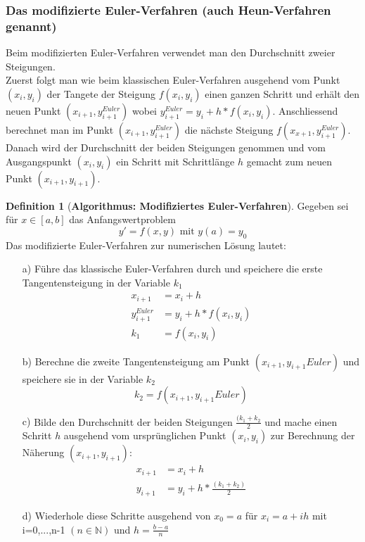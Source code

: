 \documentclass{article}
\theoremstyle{satz}
\theoremstyle{definition}
\newtheorem{definition}{Definition}
\begin{document}
\subsubsection{Das modifizierte Euler-Verfahren (auch Heun-Verfahren genannt)}
Beim modifizierten Euler-Verfahren verwendet man den Durchschnitt zweier Steigungen.\\
Zuerst folgt man wie beim klassischen Euler-Verfahren ausgehend vom Punkt $(x_i, y_i)$ der Tangete der Steigung $f(x_i, y_i)$ einen ganzen Schritt und erhält den neuen Punkt $(x_{i+1}, y^{Euler}_{i+1})$ wobei $y^{Euler}_{i+1} = y_i+h*f(x_i,y_i)$. Anschliessend berechnet man im Punkt $(x_{i+1},y^{Euler}_{i+1})$ die nächste Steigung $f(x_{x+1}, y^{Euler}_{i+1})$. Danach wird der Durchschnitt der beiden Steigungen genommen und vom Ausgangspunkt $(x_i, y_i)$ ein Schritt mit Schrittlänge $h$ gemacht zum neuen Punkt $(x_{i+1}, y_{i+1})$.

\begin{tcolorbox}
\begin{definition}[\textbf{Algorithmus: Modifiziertes Euler-Verfahren}]
Gegeben sei für $x \in [a,b]$ das Anfangswertproblem
\begin{equation}
y' = f(x,y) \textrm{ mit } y(a) = y_0
\end{equation}
Das modifizierte Euler-Verfahren zur numerischen Lösung lautet:
\begin{itemize}
\item[a)]{Führe das klassische Euler-Verfahren durch und speichere die erste Tangentensteigung in der Variable $k_1$
\begin{equation}
\begin{split}
x_{i+1} &= x_i + h\\
y_{i+1}^{Euler} &= y_i + h*f(x_i, y_i)\\
k_1 &= f(x_i, y_i)
\end{split}
\end{equation}
}
\item[b)]{Berechne die zweite Tangentensteigung am Punkt $(x_{i+1}, y_{i+1}{Euler})$ und speichere sie in der Variable $k_2$
\begin{equation}
k_2 = f(x_{i+1}, y_{i+1}{Euler})
\end{equation}
}
\item[c)]{Bilde den Durchschnitt der beiden Steigungen $\frac{(k_1 + k_2}{2}$ und mache einen Schritt $h$ ausgehend vom ursprünglichen Punkt $(x_i, y_i)$ zur Berechnung der Näherung $(x_{i+1}, y_{i+1})$:
\begin{equation}
\begin{split}
x_{i+1} &= x_i + h\\
y_{i+1} &= y_i + h * \frac{(k_1 + k_2)}{2}
\end{split}
\end{equation}
}
\item[d)]{Wiederhole diese Schritte ausgehend von $x_0 = a$ für $x_i = a + ih$ mit i=0,...,n-1 $(n \in \mathbb{N})$ und $h = \frac{b-a}{n}$
}

\end{itemize}

\end{definition}
\end{tcolorbox}
\end{document}

